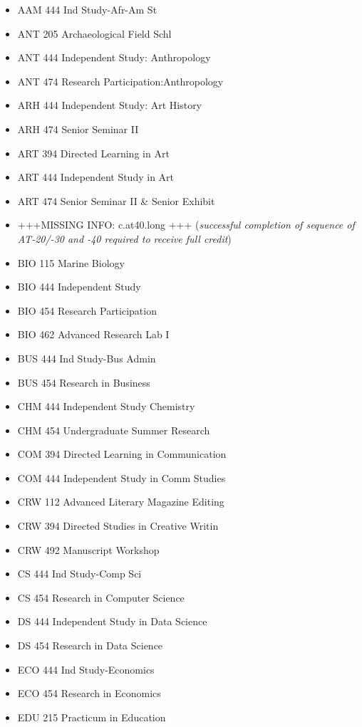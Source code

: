 \documentclass[
  letterpaper,
]{scrbook}
\providecommand{\tightlist}{%
  \setlength{\itemsep}{0pt}\setlength{\parskip}{0pt}}
\begin{document}
\begin{itemize}
\tightlist
\item
  AAM 444 Ind Study-Afr-Am St
\item
  ANT 205 Archaeological Field Schl
\item
  ANT 444 Independent Study: Anthropology
\item
  ANT 474 Research Participation:Anthropology
\item
  ARH 444 Independent Study: Art History
\item
  ARH 474 Senior Seminar II
\item
  ART 394 Directed Learning in Art
\item
  ART 444 Independent Study in Art
\item
  ART 474 Senior Seminar II \& Senior Exhibit
\item
  +++MISSING INFO: c.at40.long +++ (\emph{successful completion of
  sequence of AT-20/-30 and -40 required to receive full credit})
\item
  BIO 115 Marine Biology
\item
  BIO 444 Independent Study
\item
  BIO 454 Research Participation
\item
  BIO 462 Advanced Research Lab I
\item
  BUS 444 Ind Study-Bus Admin
\item
  BUS 454 Research in Business
\item
  CHM 444 Independent Study Chemistry
\item
  CHM 454 Undergraduate Summer Research
\item
  COM 394 Directed Learning in Communication
\item
  COM 444 Independent Study in Comm Studies
\item
  CRW 112 Advanced Literary Magazine Editing
\item
  CRW 394 Directed Studies in Creative Writin
\item
  CRW 492 Manuscript Workshop
\item
  CS 444 Ind Study-Comp Sci
\item
  CS 454 Research in Computer Science
\item
  DS 444 Independent Study in Data Science
\item
  DS 454 Research in Data Science
\item
  ECO 444 Ind Study-Economics
\item
  ECO 454 Research in Economics
\item
  EDU 215 Practicum in Education

\end{itemize}
\end{document}
